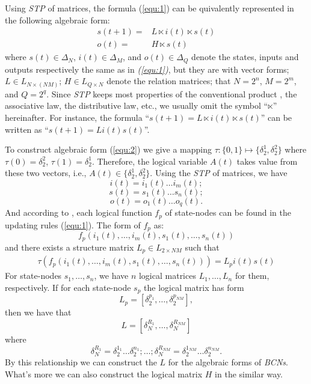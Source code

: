 Using {\em STP} of matrices, the formula (\ref{equ:1}) can be quivalently represented in the following algebraic form:
\begin{equation}
\begin{split}
s(t+1)=&L\ltimes{i(t)}\ltimes{s(t)}\\
o(t)=&H\ltimes{s(t)}
\end{split}
\label{equ:2}
\end{equation}
where $s(t)\in\Delta_N$, $i(t)\in\Delta_M$, and  $o(t)\in\Delta_Q$ denote the states, inputs and outputs respectively the same as in {\em (\ref{equ:1})}, but they are with vector forms; $L\in L_{N\times\left(NM\right)}$; $H\in L_{Q\times N}$ denote the relation matrices; that $N=2^n$, $M=2^m$, and $Q=2^q$. Since {\em STP} keeps most properties of the conventional product \cite{Cheng2011Analysis}, the associative law, the distributive law, etc., we usually omit the symbol ``$\ltimes$'' hereinafter. For instance, the 
formula ``$s(t+1)=L\ltimes{i(t)}\ltimes{s(t)}$'' can be written as ``$s(t+1)=L{i(t)}{s(t)}$''.

To construct algebraic form (\ref{equ:2}) we give a mapping $\tau:\{0,1\}\mapsto \{\delta_2^1, \delta_2^2\}$ where $\tau(0)=\delta_2^2$, $\tau(1)= \delta_2^1$. 
Therefore, the logical variable $A(t)$ takes value from these two vectors, i.e., $A(t)\in \{\delta_2^1, \delta_2^2\}$. Using the {\em STP} of matrices, we have 
\[i(t)=i_1(t){\ldots}i_m(t);\] 
\[s(t)=s_1(t){\ldots}s_n(t);\] 
\[o(t)=o_1(t){\ldots}o_q(t).\] 
And according to \cite{Cheng2003Semi}, each logical function $f_p$ of state-nodes can be found in the updating rules (\ref{equ:1}). The form of  $f_p$ as:
\[f_p(i_1(t),\ldots,i_m(t),s_1(t),\ldots,s_n(t))\] 
and there exists a structure matrix $L_p\in L_{2\times {NM}}$ such that
\begin{equation}
\begin{split}
\tau(f_p(i_1(t),\ldots,i_m(t),s_1(t),\ldots,s_n(t)))= L_pi(t)s(t)
\end{split}
\end{equation}
For state-nodes $s_1,\ldots,s_n$, we have $n$ logical matrices $L_1,\ldots,L_n$ for them, respectively. 
If for each state-node $s_p$ the logical matrix has form
\[L_p=[\delta_2^{p_1},\ldots,\delta_2^{p_{NM}}],\] 
then we have that %
\[L=[\delta_N^{R_1},\ldots,\delta_N^{R_{NM}}]\]  where 
\[\delta_N^{R_1}=\delta_2^{1_1}\ldots\delta_2^{n_1};\ldots; \delta_N^{R_{NM}}=\delta_2^{1_{NM}}\ldots\delta_2^{n_{NM}}.\] 
By this relationship we can construct the $L$ for the algebraic forms of {\em BCNs}. What's more we can also construct the logical matrix $H$ in the similar way.

